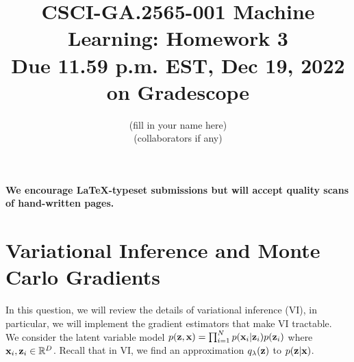 \documentclass[11pt]{article}
\begin{document}
\title{CSCI-GA.2565-001 Machine Learning: Homework 3 \\
\textbf{\large{Due 11.59 p.m. EST, Dec 19, 2022 on Gradescope}}}
\author{{\color{blue}(fill in your name here)}\\
    {\color{blue}(collaborators if any)}}
\date{}
\maketitle

\noindent \textbf{We encourage \LaTeX-typeset submissions but will accept quality scans of hand-written pages.}

\section{Variational Inference and Monte Carlo Gradients}

In this question, we will review the details of variational inference (VI), in particular, we will implement the gradient estimators that make VI tractable.\\  

\noindent We consider the latent variable model $p({\mathbf z}, {\mathbf x}) = \prod_{i=1}^N p({\mathbf x}_i|{\mathbf z}_i)p({\mathbf z}_i)$ where ${\mathbf x}_i,{\mathbf z}_i \in \mathbb{R}^D$. Recall that in VI, we find an approximation  $q_\lambda({\mathbf z})$ to $p({\mathbf z} | {\mathbf x})$. 
\end{document}
